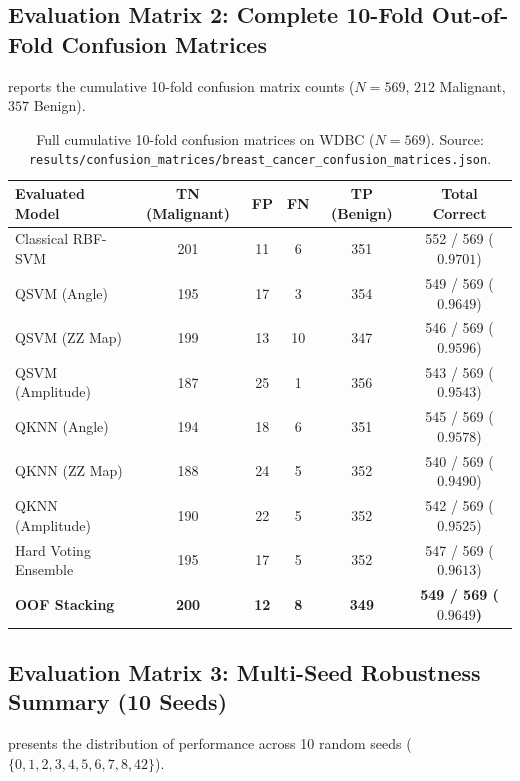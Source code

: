 \subsection{Evaluation Matrix 2: Complete 10-Fold Out-of-Fold Confusion Matrices}
 reports the cumulative 10-fold confusion matrix counts ($N=569$, $212$ Malignant, $357$ Benign).

\begin{table}[H]
\centering
\small
\caption{Full cumulative 10-fold confusion matrices on WDBC ($N=569$). Source: \texttt{results/confusion\_matrices/breast\_cancer\_confusion\_matrices.json}.}
\label{tab:confusion-matrices-full}
\begin{tabularx}{\textwidth}{lccccc}
\toprule
\textbf{Evaluated Model} & \textbf{TN (Malignant)} & \textbf{FP} & \textbf{FN} & \textbf{TP (Benign)} & \textbf{Total Correct} \\
\midrule
Classical RBF-SVM     & 201 & 11 & 6  & 351 & 552 / 569 ($0.9701$) \\
QSVM (Angle)          & 195 & 17 & 3  & 354 & 549 / 569 ($0.9649$) \\
QSVM (ZZ Map)         & 199 & 13 & 10 & 347 & 546 / 569 ($0.9596$) \\
QSVM (Amplitude)      & 187 & 25 & 1  & 356 & 543 / 569 ($0.9543$) \\
QKNN (Angle)          & 194 & 18 & 6  & 351 & 545 / 569 ($0.9578$) \\
QKNN (ZZ Map)         & 188 & 24 & 5  & 352 & 540 / 569 ($0.9490$) \\
QKNN (Amplitude)      & 190 & 22 & 5  & 352 & 542 / 569 ($0.9525$) \\
Hard Voting Ensemble  & 195 & 17 & 5  & 352 & 547 / 569 ($0.9613$) \\
\textbf{OOF Stacking} & \textbf{200} & \textbf{12} & \textbf{8} & \textbf{349} & \textbf{549 / 569 ($0.9649$)} \\
\bottomrule
\end{tabularx}
\end{table}

\subsection{Evaluation Matrix 3: Multi-Seed Robustness Summary (10 Seeds)}
 presents the distribution of performance across 10 random seeds ($\{0, 1, 2, 3, 4, 5, 6, 7, 8, 42\}$).

